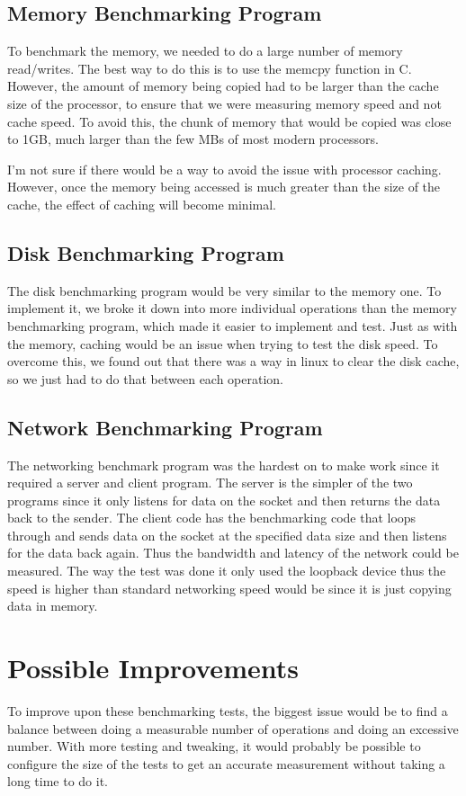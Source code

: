 \documentclass{article}
\begin{document}
\subsection{Memory Benchmarking Program}
To benchmark the memory, we needed to do a large number of memory read/writes.  The best way to do this is to use the memcpy function in C.  However, the amount of memory being copied had to be larger than the cache size of the processor, to ensure that we were measuring memory speed and not cache speed.  To avoid this, the chunk of memory that would be copied was close to 1GB, much larger than the few MBs of most modern processors.

I'm not sure if there would be a way to avoid the issue with processor caching.  However, once the memory being accessed is much greater than the size of the cache, the effect of caching will become minimal.

\subsection{Disk Benchmarking Program}
The disk benchmarking program would be very similar to the memory one.  To implement it, we broke it down into more individual operations than the memory benchmarking program, which made it easier to implement and test.  Just as with the memory, caching would be an issue when trying to test the disk speed.  To overcome this, we found out that there was a way in linux to clear the disk cache, so we just had to do that between each operation.

\subsection{Network Benchmarking Program}
The networking benchmark program was the hardest on to make work since it required a server and client program. The server is the simpler of the two programs since it only listens for data on the socket and then returns the data back to the sender. The client code has the benchmarking code that loops through and sends data on the socket at the specified data size and then listens for the data back again. Thus the bandwidth and latency of the network could be measured. The way the test was done it only used the loopback device thus the speed is higher than standard networking speed would be since it is just copying data in memory. 

\section{Possible Improvements}
To improve upon these benchmarking tests, the biggest issue would be to find a balance between doing a measurable number of operations and doing an excessive number.  With more testing and tweaking, it would probably be possible to configure the size of the tests to get an accurate measurement without taking a long time to do it. 
\end{document}
